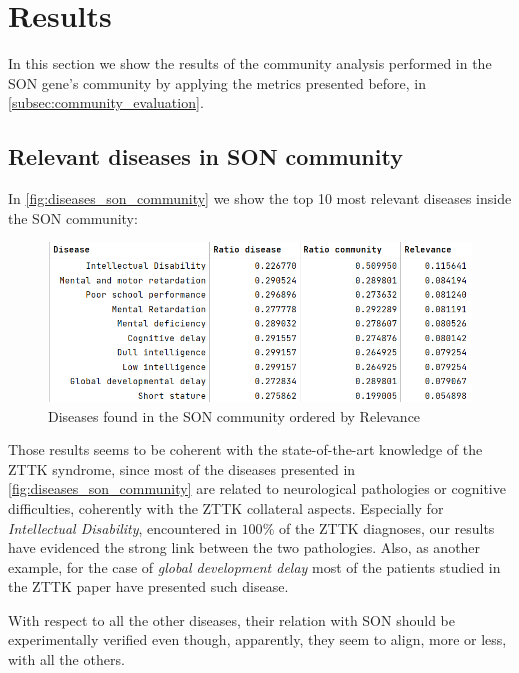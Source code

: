 \section{Results}\label{sec:results}
In this section we show the results of the community analysis performed in the SON gene's community by applying the metrics presented before, in \autoref{subsec:community_evaluation}.

\subsection{Relevant diseases in SON community}\label{subsec:relevant_diseases}
In \autoref{fig:diseases_son_community} we show the top 10 most relevant diseases inside the SON community:
\begin{figure}[H]
    \centering
    \includegraphics[width=0.9\linewidth]{images/top20_diseases_connected.png}
    \caption{Diseases found in the SON community ordered by Relevance}
    \label{fig:diseases_son_community}
\end{figure}
Those results seems to be coherent with the state-of-the-art knowledge of the ZTTK syndrome, since most of the diseases presented in \autoref{fig:diseases_son_community} are related to neurological pathologies or cognitive difficulties, coherently with the ZTTK collateral aspects. Especially for \textit{Intellectual Disability}, encountered in $100\%$ of the ZTTK diagnoses, our results have evidenced the strong link between the two pathologies. Also, as another example, for the case of \textit{global development delay} most of the patients studied in the ZTTK paper have presented such disease.
\vspace{3mm}

With respect to all the other diseases, their relation with SON should be experimentally verified even though, apparently, they seem to align, more or less, with all the others.
\vspace{3mm}

